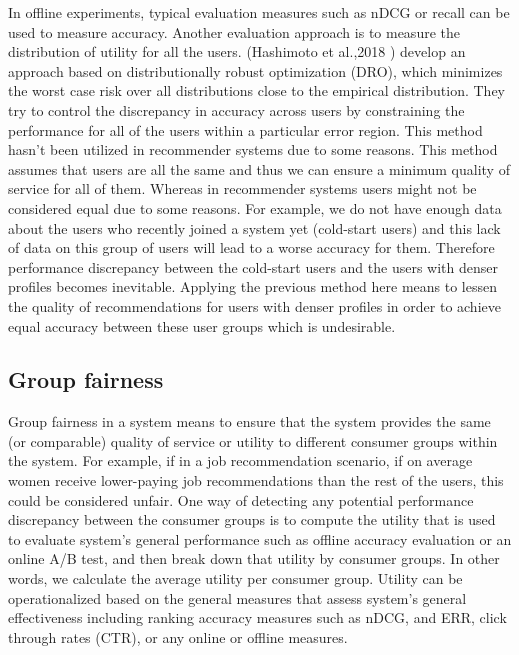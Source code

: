     In offline experiments, typical evaluation measures such as nDCG or recall can be used to measure accuracy. Another evaluation approach is to measure the distribution of utility for all the users. (Hashimoto et al.,2018 \cite{hashimoto2018fairness}) develop an approach based on distributionally robust optimization (DRO), which minimizes the worst case risk over all distributions close to the empirical distribution. They try to control the discrepancy in accuracy across users by constraining the performance for all of the users within a particular error region. This method hasn't been utilized in recommender systems due to some reasons. This method assumes that users are all the same and thus we can ensure a minimum quality of service for all of them. Whereas in recommender systems users might not be considered equal due to some reasons. For example, we do not have enough data about the users who recently joined a system yet (cold-start users) and this lack of data on this group of users will lead to a worse accuracy for them. Therefore performance discrepancy between the cold-start users and the users with denser profiles becomes inevitable. Applying the previous method here means to lessen the quality of recommendations for users with denser profiles in order to achieve equal accuracy between these user groups which is undesirable.
    
    \subsection{Group fairness}
    Group fairness in a system means to ensure that the system provides the same (or comparable) quality of service or utility to different consumer groups within the system. For example, if in a job recommendation scenario, if on average women receive lower-paying job recommendations than the rest of the users, this could be considered unfair.
    One way of detecting any potential performance discrepancy between the consumer groups is to compute the utility that is used to evaluate system's general performance such as offline accuracy evaluation or an online A/B test, and then break down that utility by consumer groups. In other words, we calculate the average utility per consumer group. Utility can be operationalized based on the general measures that assess system's general effectiveness including ranking accuracy measures such as nDCG, and ERR, click through rates (CTR), or any online or offline measures.  
    

